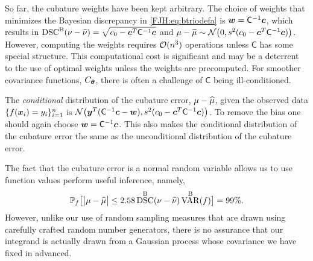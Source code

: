\documentclass[graybox,footinfo]{svmult}
\DeclareMathOperator{\disc}{DSC}
\DeclareMathOperator{\Var}{VAR}
\begin{document}
So far, the cubature weights have been kept arbitrary.  The choice of weights that 
minimizes the Bayesian discrepancy in \eqref{FJH:eq:btriodefa} is ${\boldsymbol{w}} = 
\mathsf{C}^{-1} {\boldsymbol{c}}$, which results in $\disc^{\Ba}(\nu - \hnu) = \sqrt{c_0 - \bsc ^T 
\mC^{-1} \bsc}$ and $\mu - \widehat{\mu} \sim \mathcal{N} \bigl(0 , s^2(c_0 - {\boldsymbol{c}} ^T 
\mathsf{C}^{-1} {\boldsymbol{c}}) \bigr)$.  However, computing the weights requires $\mathcal{O}(n^3)$ 
operations 
unless $\mathsf{C}$ has some special structure.  This computational cost is significant 
and may be a deterrent to the use of optimal weights unless the weights are 
precomputed. For smoother covariance functions, $C_{\boldsymbol{\theta}}$, there is often a 
challenge of $\mathsf{C}$ being ill-conditioned.

The \emph{conditional} distribution of the cubature error, $\mu - \widehat{\mu}$, given the 
observed data $ \{f({\boldsymbol{x}}_i )= y_i\}_{i=1}^n$ is $\mathcal{N} \bigl( {\boldsymbol{y}}^T (\mathsf{C}^{-1}{\boldsymbol{c}} - 
{\boldsymbol{w}}) , s^2(c_0 - {\boldsymbol{c}} ^T \mathsf{C}^{-1} {\boldsymbol{c}}) \bigr)$.  To remove the bias one should again 
choose ${\boldsymbol{w}} = \mathsf{C}^{-1} {\boldsymbol{c}}$.  This also makes the conditional distribution of 
the cubature error the same as the unconditional distribution of the cubature error.

The fact that the cubature error is a normal random variable allows us to use function 
values perform useful inference, namely, 
\begin{equation} \label{FJH:eq:MLEBdOne}
\Prob_f\bigl[\abs{\mu - \hmu} \le 2.58 
\disc^{\Ba}(\nu - \hnu) \Var^{\Ba}(f)\bigr] = 99\%.
\end{equation}
However, unlike our use of random sampling measures that are drawn using carefully 
crafted random number generators, there is no assurance that our integrand is actually 
drawn from a Gaussian process whose covariance we have fixed in advanced.  
\end{document}
